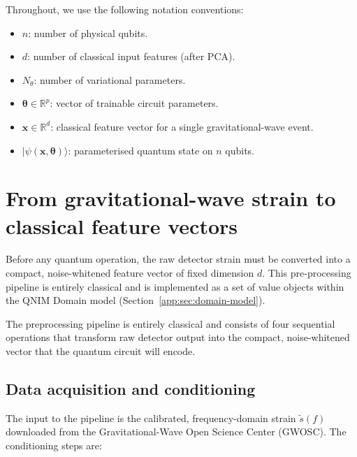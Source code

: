 \documentclass[11pt,a4paper, english]{book}
\theoremstyle{plain}
\theoremstyle{definition}
\numberwithin{equation}{chapter}
\numberwithin{figure}{chapter}
\numberwithin{table}{chapter}
\begin{document}
Throughout, we use the following notation conventions:
\begin{itemize}
  \item $n$: number of physical qubits.
  \item $d$: number of classical input features (after PCA).
  \item $N_\theta$: number of variational parameters.
  \item $\boldsymbol{\theta} \in \mathbb{R}^p$: vector of trainable circuit
        parameters.
  \item $\mathbf{x} \in \mathbb{R}^d$: classical feature vector for a
        single gravitational-wave event.
  \item $|\psi(\mathbf{x},\boldsymbol{\theta})\rangle$: parameterised
        quantum state on $n$ qubits.
\end{itemize}

\section{From gravitational-wave strain to classical feature vectors}
\label{sec:encoding}

Before any quantum operation, the raw detector strain must be converted
into a compact, noise-whitened feature vector of fixed dimension $d$.
This pre-processing pipeline is entirely classical and is implemented as
a set of value objects within the QNIM Domain model
(Section~\ref{app:sec:domain-model}).

The preprocessing pipeline is entirely classical and consists of four sequential
operations that transform raw detector output into the compact, noise-whitened
vector that the quantum circuit will encode.

\subsection{Data acquisition and conditioning}
\label{subsec:conditioning}

The input to the pipeline is the calibrated, frequency-domain strain
$\tilde{s}(f)$ downloaded from the Gravitational-Wave Open Science Center
(GWOSC).  The conditioning steps are:
\end{document}
